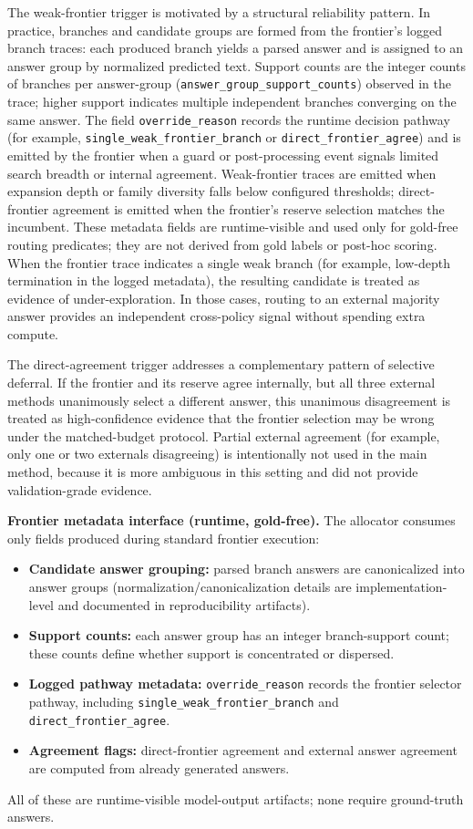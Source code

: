The weak-frontier trigger is motivated by a structural reliability pattern. In practice, branches and candidate groups are formed from the frontier's logged branch traces: each produced branch yields a parsed answer and is assigned to an answer group by normalized predicted text. Support counts are the integer counts of branches per answer-group (\texttt{answer\_group\_support\_counts}) observed in the trace; higher support indicates multiple independent branches converging on the same answer. The field \texttt{override\_reason} records the runtime decision pathway (for example, \texttt{single\_weak\_frontier\_branch} or \texttt{direct\_frontier\_agree}) and is emitted by the frontier when a guard or post-processing event signals limited search breadth or internal agreement. Weak-frontier traces are emitted when expansion depth or family diversity falls below configured thresholds; direct-frontier agreement is emitted when the frontier's reserve selection matches the incumbent. These metadata fields are runtime-visible and used only for gold-free routing predicates; they are not derived from gold labels or post-hoc scoring.
When the frontier trace indicates a single weak branch (for example, low-depth
termination in the logged metadata), the resulting candidate is treated as
evidence of under-exploration.
In those cases, routing to an external majority answer provides an independent
cross-policy signal without spending extra compute.

The direct-agreement trigger addresses a complementary pattern of selective
deferral.
If the frontier and its reserve agree internally, but all three external methods
unanimously select a different answer, this unanimous disagreement is treated as
high-confidence evidence that the frontier selection may be wrong under the
matched-budget protocol.
Partial external agreement (for example, only one or two externals disagreeing)
is intentionally not used in the main method, because it is more ambiguous in
this setting and did not provide validation-grade evidence.

\medskip\noindent\textbf{Frontier metadata interface (runtime, gold-free).}
The allocator consumes only fields produced during standard frontier execution:
\begin{itemize}[nosep,leftmargin=1.5em]
  \item \textbf{Candidate answer grouping:} parsed branch answers are canonicalized into answer groups (normalization/canonicalization details are implementation-level and documented in reproducibility artifacts).
  \item \textbf{Support counts:} each answer group has an integer branch-support count; these counts define whether support is concentrated or dispersed.
  \item \textbf{Logged pathway metadata:} \texttt{override\_reason} records the frontier selector pathway, including \texttt{single\_weak\_frontier\_branch} and \texttt{direct\_frontier\_agree}.
  \item \textbf{Agreement flags:} direct-frontier agreement and external answer agreement are computed from already generated answers.
\end{itemize}
All of these are runtime-visible model-output artifacts; none require ground-truth answers.

